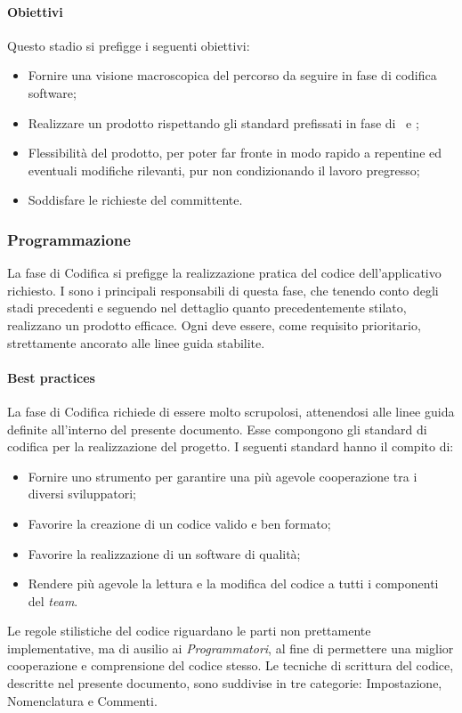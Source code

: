		\paragraph{Obiettivi}
		Questo stadio si prefigge i seguenti obiettivi:
		\begin{itemize}
			\item Fornire una visione macroscopica del percorso da seguire in fase di codifica software;
			\item Realizzare un prodotto rispettando gli standard prefissati in fase di \SdF\ e \AdR;
			\item Flessibilità del prodotto, per poter far fronte in modo rapido a repentine ed eventuali modifiche rilevanti, pur non condizionando il lavoro pregresso;
			\item Soddisfare le richieste del committente.
		\end{itemize}
	
	\subsubsection{Programmazione}
	La fase di Codifica si prefigge la realizzazione pratica del codice dell'applicativo richiesto. I \textit{\Progrs} sono i principali responsabili di questa fase, che tenendo conto degli stadi precedenti e seguendo nel dettaglio quanto precedentemente stilato, realizzano un prodotto efficace. Ogni \textit{\Progr} deve essere, come requisito prioritario, strettamente ancorato alle linee guida stabilite.
	
		\paragraph{Best practices}
		La fase di Codifica richiede di essere molto scrupolosi, attenendosi alle linee guida definite all'interno del presente documento. Esse compongono gli standard di codifica per la realizzazione del progetto. I seguenti standard hanno il compito di:
		\begin{itemize}
			\item Fornire uno strumento per garantire una più agevole cooperazione tra i diversi sviluppatori;
			\item Favorire la creazione di un codice valido e ben formato;
			\item Favorire la realizzazione di un software di qualità;
			\item Rendere più agevole la lettura e la modifica del codice a tutti i componenti del \textit{team}.
		\end{itemize}
		Le regole stilistiche del codice riguardano le parti non prettamente implementative, ma di ausilio ai \textit{Programmatori}, al fine di permettere una miglior cooperazione e comprensione del codice stesso. Le tecniche di scrittura del codice, descritte nel presente documento, sono suddivise in tre categorie: Impostazione, Nomenclatura e Commenti.
	
